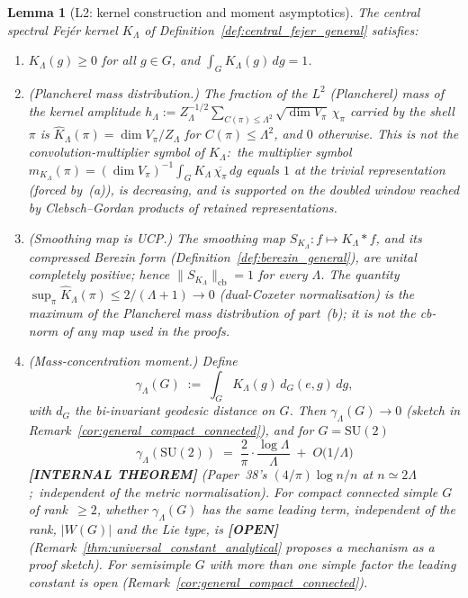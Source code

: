 \documentclass[11pt,a4paper]{article}
\theoremstyle{plain}
\newtheorem{lemma}[theorem]{Lemma}
\theoremstyle{definition}
\newcommand{\Lammax}{\Lambda}
\newcommand{\cbnorm}[1]{\lVert #1 \rVert_{\mathrm{cb}}}
\newcommand{\SU}{\mathrm{SU}}
\newcommand{\Cas}{C}
\newcommand{\KS}{K}
\newcommand{\Khat}{\widehat{K}}
\begin{document}
\begin{lemma}[L2: kernel construction and moment asymptotics]\label{lem:L2}
The central spectral Fej\'er kernel $\KS_\Lammax$ of
Definition~\ref{def:central_fejer_general} satisfies:
\begin{enumerate}\setlength{\itemsep}{2pt}
\item[(a)] $\KS_\Lammax(g) \ge 0$ for all $g \in G$, and
$\int_G \KS_\Lammax(g)\, dg = 1$.
\item[(b)] (Plancherel mass distribution.) The fraction of the $L^2$
(Plancherel) mass of the kernel amplitude
$h_\Lammax := Z_\Lammax^{-1/2} \sum_{\Cas(\pi) \le \Lammax^2}
\sqrt{\dim V_\pi}\, \chi_\pi$ carried by the shell $\pi$ is
$\Khat_\Lammax(\pi) = \dim V_\pi / Z_\Lammax$ for
$\Cas(\pi) \le \Lammax^2$, and $0$ otherwise. This is \emph{not} the
convolution-multiplier symbol of $\KS_\Lammax$:\ the multiplier
symbol $m_{\KS_\Lammax}(\pi) = (\dim V_\pi)^{-1} \int_G
\KS_\Lammax\, \overline{\chi_\pi}\, dg$ equals $1$ at the trivial
representation (forced by~(a)), is decreasing, and is supported on
the doubled window reached by Clebsch--Gordan products of retained
representations.
\item[(c)] (Smoothing map is UCP.) The smoothing map
$S_{\KS_\Lammax}: f \mapsto \KS_\Lammax * f$, and its compressed
Berezin form (Definition~\ref{def:berezin_general}), are unital
completely positive; hence $\cbnorm{S_{\KS_\Lammax}} = 1$ for every
$\Lammax$. The quantity
$\sup_\pi \Khat_\Lammax(\pi) \le 2/(\Lammax + 1) \to 0$ (dual-Coxeter
normalisation) is the maximum of the Plancherel mass distribution of
part~(b); it is not the cb-norm of any map used in the proofs.
\item[(d)] (Mass-concentration moment.) Define
\begin{equation}\label{eq:gamma_def_general}
   \gamma_\Lammax(G)
   \;:=\; \int_G \KS_\Lammax(g)\, d_G(e, g)\, dg,
\end{equation}
with $d_G$ the bi-invariant geodesic distance on $G$. Then
$\gamma_\Lammax(G) \to 0$ (sketch in
Remark~\ref{cor:general_compact_connected}), and for $G = \SU(2)$
\begin{equation}\label{eq:universal_rate}
   \gamma_\Lammax(\SU(2))
   \;=\; \frac{2}{\pi} \cdot \frac{\log \Lammax}{\Lammax}
   \;+\; O\!\bigl(1/\Lammax\bigr)
\end{equation}
\textbf{[INTERNAL THEOREM]} (Paper~38's $(4/\pi)\log n/n$ at
$n \simeq 2\Lammax$;\ independent of the metric normalisation).  For
compact connected simple $G$ of rank~$\ge 2$, whether $\gamma_\Lammax(G)$
has the same leading term, independent of the rank, $|W(G)|$ and the
Lie type, is \textbf{[OPEN]}
(Remark~\ref{thm:universal_constant_analytical} proposes a mechanism as
a proof sketch).  For semisimple $G$ with more than one simple factor the
leading constant is open (Remark~\ref{cor:general_compact_connected}).
\end{enumerate}
\end{lemma}
\end{document}

